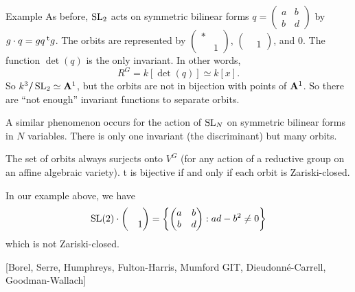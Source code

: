\begin{enonce}[remark]{Example}
As before, $\operatorname{SL}_2$ acts on symmetric bilinear forms 
$q=\begin{pmatrix} a & b \\ b & d \end{pmatrix}$ by 
$g\cdot q= g q \prescript{\mathrm{t}}{}{g}$. The orbits are represented by 
$\begin{pmatrix} \ast \\ & 1 \end{pmatrix}$, 
$\begin{pmatrix} \\ & 1 \end{pmatrix}$, and $0$. The function 
$\det(q)$ is the only invariant. In other words, 
\[
  R^G=k[\det(q)]\simeq k[x] .
\]
So $k^3/ \! \! \! / \operatorname{SL}_2\simeq \mathbf{A}^1$, but the orbits are not in 
bijection with points of $\mathbf{A}^1$. So there are ``not enough'' invariant 
functions to separate orbits. 
\end{enonce}

A similar phenomenon occurs for the action of $\operatorname{SL}_N$ on 
symmetric bilinear forms in $N$ variables. There is only one invariant (the 
discriminant) but many orbits. 

\begin{theo}
The set of orbits always surjects onto $V^G$ (for any action of a reductive 
group on an affine algebraic variety). t is bijective if and only if each orbit 
is Zariski-closed. 
\end{theo}

In our example above, we have
\[
  \operatorname{SL}(2)\cdot \begin{pmatrix} \\ & 1\end{pmatrix} = \left\{\begin{pmatrix} a & b \\ b & d \end{pmatrix} : a d-b^2\ne 0\right\} 
\]
which is not Zariski-closed. 

[Borel, Serre, Humphreys, Fulton-Harris, Mumford GIT, 
Dieudonn\'e-Carrell, Goodman-Wallach]




